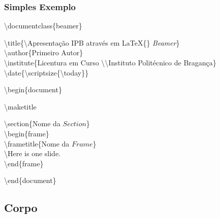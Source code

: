 \documentclass[article]{beamer}%
\begin{document}
\begin{frame}
\frametitle{Simples Exemplo}
\scriptsize{
\textbackslash documentclass\{beamer\}\\ \vspace{0.1cm}

\textbackslash title\{\textbackslash Apresentação IPB através em \LaTeX\{\} \emph{Beamer}\} \\
\textbackslash author\{Primeiro Autor\}\\
\textbackslash institute\{Licentura em Curso \textbackslash\textbackslash Instituto Politécnico de Bragança\}\\
\textbackslash date\{\textbackslash scriptsize\{\textbackslash today\}\}
 \\ \vspace{0.3cm}

\textbackslash begin\{document\} \\ \vspace{0.1cm}

\hspace{0.5cm}\textbackslash maketitle\\ \vspace{0.1cm}

\hspace{0.5cm}\textbackslash section\{Nome da $Section$\}\\
\hspace{0.5cm}\textbackslash begin\{frame\}\\
\hspace{1cm}\textbackslash frametitle\{Nome da $Frame$\}\\
\hspace{1cm}\textbackslash Here is one slide.\\
\hspace{0.5cm}\textbackslash end\{frame\}\\ \vspace{0.1cm}

\textbackslash end\{document\}\\
}

\end{frame}


\subsection{Corpo}
\end{document}
